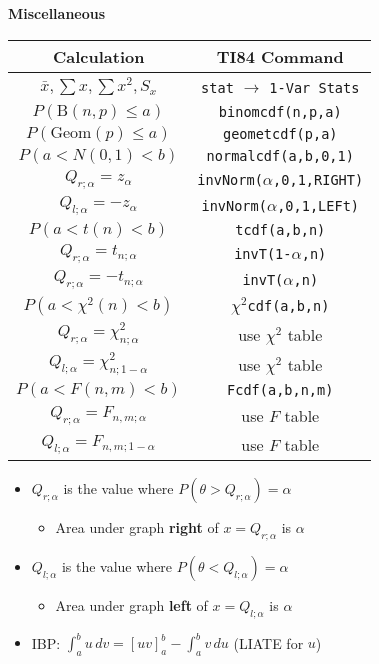 \documentclass[a4paper, 12pt]{article}
\begin{document}
\begin{multicols*}{4}
{\small\textbf{Miscellaneous}}\\
\begin{tabular}{ |c|c| }
    \hline
    \textbf{Calculation} & \textbf{TI84 Command}        \\ 
    \hline
    $\bar{x}, \sum x,\sum x^2, S_x$ & \texttt{stat} $\rightarrow$ \texttt{1-Var Stats} \\
    \hline
    $P(\text{B}(n,p) \leq a)$ & \texttt{binomcdf(n,p,a)} \\
    $P(\text{Geom}(p) \leq a)$ & \texttt{geometcdf(p,a)}\\
    \hline
    $P(a<N(0,1)<b)$   & \texttt{normalcdf(a,b,0,1)} \\ 
    $Q_{r;\alpha} = z_\alpha$  & \texttt{invNorm($\alpha$,0,1,RIGHT)}  \\ 
    $Q_{l;\alpha} = -z_\alpha$  & \texttt{invNorm($\alpha$,0,1,LEFt)}  \\ 
    \hline
    $P(a<t(n)<b)$ & \texttt{tcdf(a,b,n)} \\
    $Q_{r;\alpha} = t_{n;\alpha}$ & \texttt{invT(1-$\alpha$,n)} \\ 
    $Q_{r;\alpha} = -t_{n;\alpha}$ & \texttt{invT($\alpha$,n)} \\ 
    \hline
    $P(a<\chi^2(n)<b)$ & \texttt{$\chi^2$cdf(a,b,n)} \\
    $Q_{r;\alpha} = \chi^2_{n;\alpha}$ & use $\chi^2$ table \\
    $Q_{l;\alpha} = \chi^2_{n;1-\alpha}$ & use $\chi^2$ table \\
    \hline
    $P(a<F(n,m)<b)$ & \texttt{Fcdf(a,b,n,m)} \\
    $Q_{r;\alpha} = F_{n,m;\alpha}$ & use $F$ table \\
    $Q_{l;\alpha} = F_{n,m;1-\alpha}$ & use $F$ table \\
    \hline
\end{tabular}
\begin{itemize}
    \item $Q_{r;\alpha}$ is the value where $P(\theta > Q_{r;\alpha}) = \alpha$
    \begin{itemize}
        \item Area under graph \textbf{right} of $x = Q_{r;\alpha}$ is $\alpha$
    \end{itemize}
    \item $Q_{l;\alpha}$ is the value where $P(\theta < Q_{l;\alpha}) = \alpha$
    \begin{itemize}
        \item Area under graph \textbf{left} of $x = Q_{l;\alpha}$ is $\alpha$
    \end{itemize}
    \item IBP: $\int_a^bu\,dv = [uv]_a^b-\int_a^bv\,du$ (LIATE for $u$) 
\end{itemize}

\end{multicols*}
\end{document}
